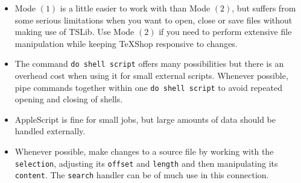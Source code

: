 \documentclass[11pt]{amsart}
\begin{document}
\begin{itemize}
\item Mode $(1)$ is a little easier to work with than Mode $(2)$, but suffers from some serious limitations when you want to open, close or save files without making use of \textsf{TSLib}. Use Mode $(2)$ if you need to perform extensive file manipulation while keeping  TeXShop responsive to changes.
\item The command {\tt do shell script} offers many possibilities but there is an overhead cost when using it for small external scripts. Whenever possible, pipe commands together within one {\tt do shell script} to avoid repeated opening and closing of shells.
\item AppleScript is fine for small jobs, but large amounts of data should be handled externally.
\item Whenever possible, make changes to a source file by working with the {\tt selection}, adjusting its {\tt offset} and {\tt length} and then manipulating its {\tt content}. The {\tt search} handler can be of much use in this connection.
\end{itemize}
\end{document}
